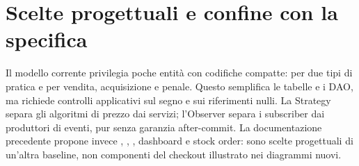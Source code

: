 \section{Scelte progettuali e confine con la specifica}
Il modello corrente privilegia poche entità con codifiche compatte:  per due tipi di pratica e  per vendita, acquisizione e penale. Questo semplifica le tabelle e i DAO, ma richiede controlli applicativi sul segno e sui riferimenti nulli. La Strategy separa gli algoritmi di prezzo dai servizi; l'Observer separa i subscriber dai produttori di eventi, pur senza garanzia after-commit. La documentazione precedente propone invece , , , dashboard e stock order: sono scelte progettuali di un'altra baseline, non componenti del checkout illustrato nei diagrammi nuovi.
